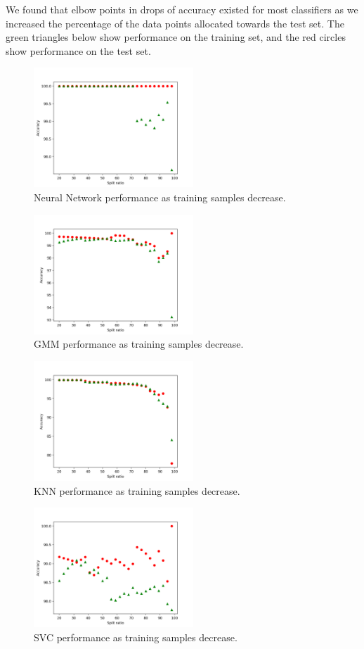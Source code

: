 \documentclass{article}
\begin{document}
We found that elbow points in drops of accuracy existed for most classifiers as we increased the percentage of the data points allocated towards the test set. The green triangles below show performance on the training set, and the red circles show performance on the test set.
\begin{figure}
\centering
\includegraphics[width=60mm]{NN.png}
  \caption{Neural Network performance as training samples decrease.}
  \end{figure}
  \newline
\begin{figure} 
\centering
\includegraphics[width=60mm]{gaussian.png}
  \caption{GMM performance as training samples decrease.}
    \end{figure}
      \newline
    \begin{figure}
    \centering
\includegraphics[width=60mm]{KNN.png}
  \caption{KNN performance as training samples decrease.}
      \end{figure}
        \newline
          \begin{figure}
          \centering
\includegraphics[width=60mm]{linear.png}
  \caption{SVC performance as training samples decrease.}
        \end{figure}
\end{document}
